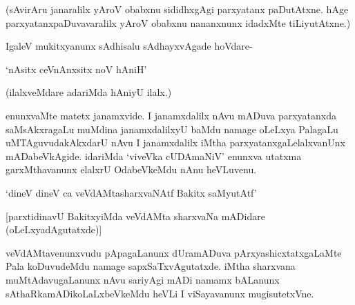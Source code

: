 (sAvirAru janaralilx yAroV obabxnu sididhxgAgi parxyatanx paDutAtxne. hAge parxyatanxpaDuvavaralilx yAroV obabxnu nananxnunx idadxMte tiLiyutAtxne.)

IgaleV mukitxyanunx sAdhisalu sAdhayxvAgade hoVdare-

\begin{shloka}
`nAsitx ceVnAnxsitx noV hAniH'
\end{shloka}

(ilalxveMdare adariMda hAniyU ilalx.)

enunxvaMte matetx janamxvide. I janamxdalilx nAvu mADuva parxyatanxda saMsAkxragaLu muMdina janamxdalilxyU baMdu namage oLeLxya PalagaLu uMTAguvudakAkxdarU nAvu I janamxdalilx iMtha parxyatanxgaLelalxvanUnx mADabeVkAgide. idariMda `viveVka cUDAmaNiV' enunxva utatxma garxMthavanunx elalxrU OdabeVkeMdu nAnu heVLuvenu.

\begin{shloka}
`dineV dineV ca veVdAMtasharxvaNAtf Bakitx saMyutAtf'
\end{shloka}

[parxtidinavU BakitxyiMda veVdAMta sharxvaNa mADidare (oLeLxyadAgutatxde)]

veVdAMtavenunxvudu pApagaLanunx dUramADuva pArxyashicxtatxgaLaMte Pala koDuvudeMdu namage sapxSaTxvAgutatxde. iMtha sharxvana muMtAdavugaLanunx nAvu sariyAgi mADi namamx bALanunx sAthaRkamADikoLaLxbeVkeMdu heVLi I viSayavanunx mugisutetxVne.


\endchapter
